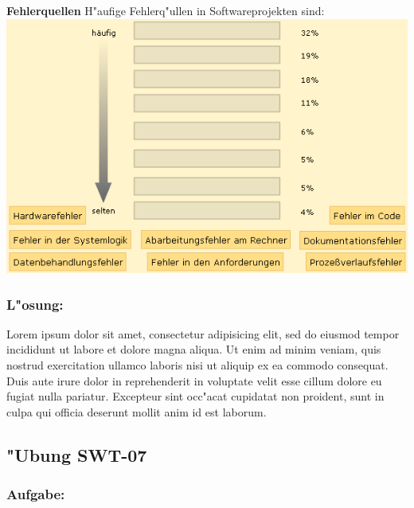 \begin{framed}
\textbf{Fehlerquellen}
\smallbreak
H"aufige Fehlerq"ullen in Softwareprojekten sind:
\bigbreak
\includegraphics[width=1.0\textwidth]{./images/ueb01-06.png}
\end{framed}
\bigbreak
\bigbreak
\subsubsection*{L"osung:}
Lorem ipsum dolor sit amet, consectetur adipisicing elit, sed do eiusmod tempor incididunt ut labore et dolore magna aliqua. Ut enim ad minim veniam, quis nostrud exercitation ullamco laboris nisi ut aliquip ex ea commodo consequat. Duis aute irure dolor in reprehenderit in voluptate velit esse cillum dolore eu fugiat nulla pariatur. Excepteur sint occ"acat cupidatat non proident, sunt in culpa qui officia deserunt mollit anim id est laborum.

\newpage
\subsection{"Ubung SWT-07}
\subsubsection*{Aufgabe:}

